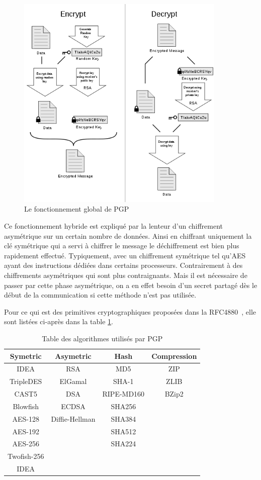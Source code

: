\begin{figure}[h!]
\includegraphics[width=10cm]{images/PGP_101.png}
\centering
\caption{Le fonctionnement global de PGP~\cite{wiki:pgpGlobal}}
\label{fig:PGP_101}
\end{figure}

Ce fonctionnement hybride est expliqué par la lenteur d’un chiffrement asymétrique sur un certain nombre de données. Ainsi en chiffrant uniquement la clé symétrique qui a servi à chiffrer le message le déchiffrement est bien plus rapidement effectué. Typiquement, avec un chiffrement symétrique tel qu’AES ayant des instructions dédiées dans certains processeurs. Contrairement à des chiffrements asymétriques qui sont plus contraignants. Mais il est nécessaire de passer par cette phase asymétrique, on a en effet besoin d'un secret partagé dès le début de la communication si cette méthode n'est pas utilisée.

Pour ce qui est des primitives cryptographiques proposées dans la RFC4880~\cite{RFC4880}, elle sont listées ci-après dans la table \ref{table:refPGPAlgos}.

\begin{table}[h!]
	\centering
	\begin{tabular}{||c c c c||}
		\hline
		Symetric & Asymetric & Hash & Compression \\ [0.5ex]
		\hline\hline
		IDEA & RSA & MD5 & ZIP \\
		TripleDES & ElGamal & SHA-1 & ZLIB \\
		CAST5 & DSA & RIPE-MD160 & BZip2 \\
		Blowfish & ECDSA & SHA256 & \\
		AES-128 & Diffie-Hellman & SHA384 & \\
		AES-192 & & SHA512 & \\
		AES-256 & & SHA224 & \\
		Twofish-256 & & & \\
		IDEA & & & \\
		\hline
	\end{tabular}
\caption{Table des algorithmes utilisés par PGP}
\label{table:refPGPAlgos}
\end{table}

